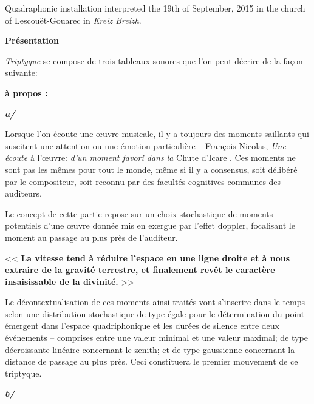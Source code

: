 \bigskip

Quadraphonic installation interpreted the 19th of September, 2015 in the church of Lescou\"et-Gouarec in \textit{Kreiz Breizh}.

\bigskip

\noindent \textbf{{\large Pr\'esentation}}
\hrulefill

\bigskip

\textsl{Triptyque} se compose de trois tableaux sonores que l'on peut d\'ecrire de la fa\c{c}on suivante: 

\bigskip

\textbf{\`{a} propos :}

\bigskip

  \textbf{\textit{a/}}

 Lorsque l'on \'{e}coute une \oe{}uvre musicale, il y a toujours des moments saillants qui suscitent une attention ou une \'{e}motion particuli\`{e}re -- Fran\c{c}ois Nicolas, \textit{Une \'ecoute} \`a l'\oe{}uvre: \textit{d'un moment favori dans la} Chute d'Icare \citep[pp. 27-45]{bf}. Ces moments ne sont pas les m\^emes pour tout le monde, m\^eme si il y a consensus, soit d\'{e}lib\'{e}r\'{e} par le compositeur, soit reconnu par des facult\'{e}s cognitives communes des auditeurs. 
 
 Le concept de cette partie repose sur un choix stochastique de moments potentiels d'une \oe{}uvre donn\'{e}e mis en exergue par l'effet doppler, focalisant le moment au passage au plus pr\`{e}s de l'auditeur. 
 
 \bigskip

<< \textbf{La vitesse tend \`{a} r\'{e}duire l'espace en une ligne droite et \`{a} nous extraire de la gravit\'{e} terrestre, et finalement rev\^et le caract\`{e}re insaisissable de la divinit\'{e}.} >> \citep{ftm}

\bigskip
	
Le d\'{e}contextualisation de ces moments ainsi trait\'{e}s vont s'inscrire dans le temps selon une distribution stochastique de type \'{e}gale pour le d\'{e}termination du point \'{e}mergent dans l'espace quadriphonique et les dur\'{e}es de silence entre deux \'{e}v\'{e}nements -- comprises entre une valeur minimal et une valeur maximal; de type d\'{e}croissante lin\'{e}aire concernant le zenith; et de type gaussienne concernant la distance de passage au plus pr\`{e}s. Ceci constituera le premier mouvement  de ce triptyque.

\bigskip
\bigskip

  \textbf{\textit{b/}}
 
